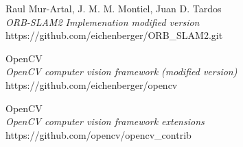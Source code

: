 \documentclass[11pt,a4paper,titlepage,oneside]{report}
\begin{document}
\begin{thebibliography}{1}
  Raul Mur-Artal, J. M. M. Montiel, Juan D. Tardos\\
  \textit{ORB-SLAM2 Implemenation modified version}\\
	https://github.com/eichenberger/ORB\_SLAM2.git

	OpenCV\\
	\textit{OpenCV computer vision framework (modified version)}\\
	https://github.com/eichenberger/opencv

	OpenCV\\
	\textit{OpenCV computer vision framework extensions}\\
	https://github.com/opencv/opencv\_contrib

\end{thebibliography}
\end{document}
